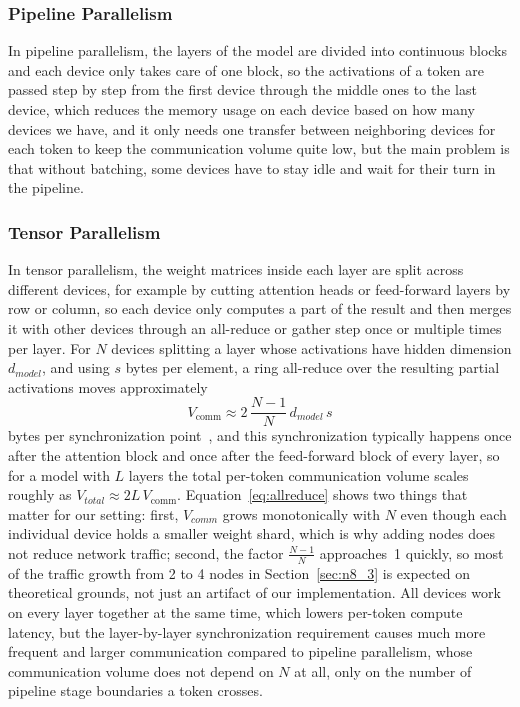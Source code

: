 \documentclass[11pt,a4paper]{article}
\begin{document}
\subsubsection{Pipeline Parallelism}\label{sec:n2_2_2}
In pipeline parallelism, the layers of the model are divided into continuous blocks and each device only takes care of one block, so the activations of a token are passed step by step from the first device through the middle ones to the last device, which reduces the memory usage on each device based on how many devices we have, and it only needs one transfer between neighboring devices for each token to keep the communication volume quite low, but the main problem is that without batching, some devices have to stay idle and wait for their turn in the pipeline.

\subsubsection{Tensor Parallelism}\label{sec:n2_2_3}
In tensor parallelism, the weight matrices inside each layer are split across different devices, for example by cutting attention heads or feed-forward layers by row or column, so each device only computes a part of the result and then merges it with other devices through an all-reduce or gather step once or multiple times per layer. For $N$ devices splitting a layer whose activations have hidden dimension $d_{model}$, and using $s$ bytes per element, a ring all-reduce over the resulting partial activations moves approximately
\begin{equation}
V_{\text{comm}} \approx 2\,\frac{N-1}{N}\, d_{model}\, s
\label{eq:allreduce}
\end{equation}
bytes per synchronization point~\cite{shoeybi2019}, and this synchronization typically happens once after the attention block and once after the feed-forward block of every layer, so for a model with $L$ layers the total per-token communication volume scales roughly as $V_{total} \approx 2L\,V_{\text{comm}}$. Equation~\ref{eq:allreduce} shows two things that matter for our setting: first, $V_{comm}$ grows monotonically with $N$ even though each individual device holds a smaller weight shard, which is why adding nodes does not reduce network traffic; second, the factor $\frac{N-1}{N}$ approaches~1 quickly, so most of the traffic growth from 2 to 4 nodes in Section~\ref{sec:n8_3} is expected on theoretical grounds, not just an artifact of our implementation. All devices work on every layer together at the same time, which lowers per-token compute latency, but the layer-by-layer synchronization requirement causes much more frequent and larger communication compared to pipeline parallelism, whose communication volume does not depend on $N$ at all, only on the number of pipeline stage boundaries a token crosses.
\end{document}
